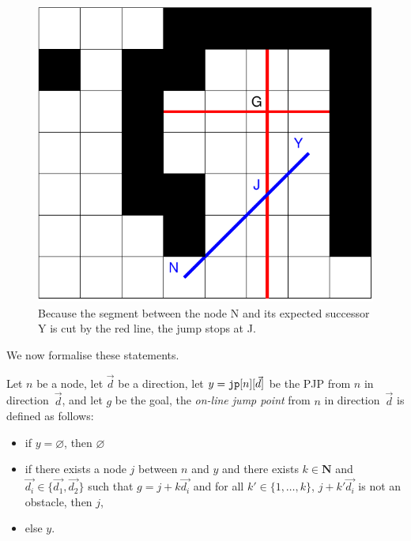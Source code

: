 \begin{figure}[ht]
  \begin{center}
  \includegraphics[scale=0.7]{inserted}
  \end{center}
  \caption{Because the segment between the node N 
    and its expected successor Y 
    is cut by the red line, 
    the jump stops at J.}
  \label{fig::inserted}
\end{figure}

We now formalise these statements.  

\begin{definition}\label{def::insertion}
  Let $n$ be a node, 
  let $\vec{d}$ be a direction, 
  let $y = \texttt{jp}[n][\vec{d}]$ be the PJP from $n$ in direction~$\vec{d}$, 
  and let $g$ be the goal, 
  the \emph{on-line jump point} from $n$ in direction~$\vec{d}$ 
  is defined as follows: 
  \begin{itemize}
  \item 
    if $y = \varnothing$, then $\varnothing$
  \item 
    if there exists a node $j$ between $n$ and $y$ 
    and there exists $k \in \mathbf{N}$ 
    and $\vec{d_i} \in \{\vec{d_1},\vec{d_2}\}$ 
    such that $g = j + k \vec{d_i}$ 
    and for all $k' \in \{1,\dots,k\}$, $j + k' \vec{d_i}$ 
    is not an obstacle, 
    then $j$, 
  \item 
    else $y$.  
  \end{itemize}
\end{definition}

